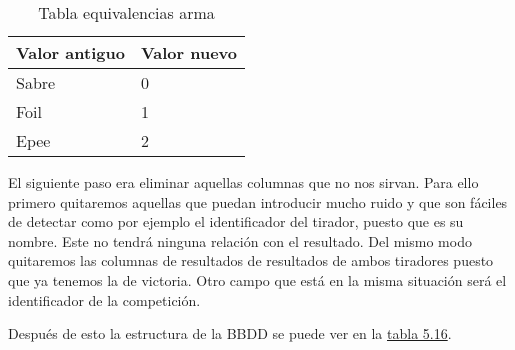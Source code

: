 \begin{table}[]
  \centering
  \caption{Tabla equivalencias arma}
  \label{tab:Tabla equivalencias arma}
  \begin{tabular}{|ll|}
    \hline
    \rowcolor[HTML]{C0C0C0}
    Valor antiguo & Valor nuevo \\ \hline
    Sabre & 0 \\ \hline
    Foil & 1 \\ \hline
    Epee & 2 \\ \hline
  \end{tabular}
\end{table}

El siguiente paso era eliminar aquellas columnas que no nos sirvan. Para ello
primero quitaremos aquellas que puedan introducir mucho ruido y que son fáciles
de detectar como por ejemplo el identificador del tirador, puesto que es su nombre.
Este no tendrá ninguna relación con el resultado. Del mismo modo quitaremos las columnas
de resultados de resultados de ambos tiradores puesto que ya tenemos la de victoria.
Otro campo que está en la misma situación será el identificador de la competición.

Después de esto la estructura de la BBDD se puede ver en la \hyperref[tab:Estructura BBDD final postproceso]{tabla 5.16}.


